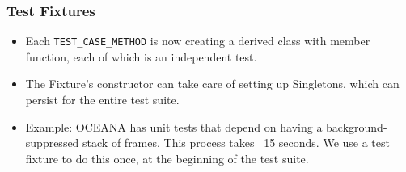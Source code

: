 \begin{frame}
\frametitle{Test Fixtures}
\begin{itemize}
\item Each \texttt{TEST\_CASE\_METHOD} is now creating a derived class
  with member function, each of which is an independent test.
\item The Fixture's constructor can take care of setting up
  Singletons, which can persist for the entire test suite.
\item Example: OCEANA has unit tests that depend on having a
  background-suppressed stack of frames.  This process takes ~15
  seconds.  We use a test fixture to do this once, at the beginning of
  the test suite.
\end{itemize}

\end{frame}


